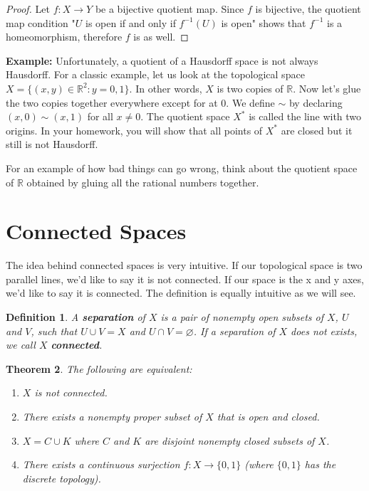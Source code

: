 \documentclass[a4paper]{article}
\newtheorem{theorem}{Theorem}
\newtheorem{definition}[theorem]{Definition}
\numberwithin{theorem}{section}
\begin{document}
\begin{proof}
Let $f: X \rightarrow Y$ be a bijective quotient map. Since $f$ is bijective, the quotient map condition "$U$ is open if and only if $f^{-1}(U)$ is open" shows that $f^{-1}$ is a homeomorphism, therefore $f$ is as well.

\end{proof}

\textbf{Example:} Unfortunately, a quotient of a Hausdorff space is not always Hausdorff. For a classic example, let us look at the topological space $X = \{(x,y) \in \mathbb{R}^2 : y = 0,1 \}$. In other words, $X$ is two copies of $\mathbb{R}$. Now let's glue the two copies together everywhere except for at 0. We define $\sim$ by declaring $(x,0) \sim (x,1)$ for all $x \neq 0$. The quotient space $X^*$ is called the line with two origins. In your homework, you will show that all points of $X^*$ are closed but it still is not Hausdorff.

For an example of how bad things can go wrong, think about the quotient space of $\mathbb{R}$ obtained by gluing all the rational numbers together.


\section{Connected Spaces}

The idea behind connected spaces is very intuitive. If our topological space is two parallel lines, we'd like to say it is not connected. If our space is the x and y axes, we'd like to say it is connected. The definition is equally intuitive as we will see.

\begin{definition}
A \textbf{separation} of $X$ is a pair of nonempty open subsets of $X$, $U$ and $V$, such that $U \cup V = X$ and $U \cap V = \varnothing$. If a separation of $X$ does not exists, we call $X$ \textbf{connected}.
\end{definition}

\begin{theorem}
The following are equivalent:

\begin{enumerate}
    \item $X$ is not connected.
    \item There exists a nonempty proper subset of $X$ that is open and closed.
    \item $X = C \cup K$ where $C$ and $K$ are disjoint nonempty closed subsets of $X$.
    \item There exists a continuous surjection $f: X \rightarrow \{0,1\}$ (where $\{0,1\}$ has the discrete topology).
\end{enumerate}
\end{theorem}
\end{document}
